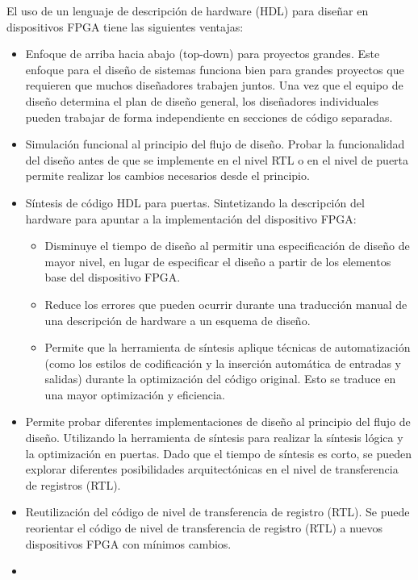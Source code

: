 El uso de un lenguaje de descripción de hardware (HDL) para diseñar en dispositivos FPGA tiene las siguientes
ventajas:
\begin{itemize}
\item
Enfoque de arriba hacia abajo (top-down) para proyectos grandes.
Este enfoque para el diseño de sistemas funciona bien para grandes proyectos que requieren que muchos diseñadores trabajen juntos. Una vez que el equipo de diseño determina el plan de diseño general, los diseñadores individuales pueden trabajar de forma independiente en secciones de código separadas.
\item
Simulación funcional al principio del flujo de diseño.
Probar la funcionalidad del diseño antes de que se implemente en el nivel RTL o en el nivel de puerta permite realizar los cambios necesarios desde el principio.

\item
Síntesis de código HDL para puertas. Sintetizando la descripción del hardware para apuntar a la implementación del dispositivo FPGA:

	\begin{itemize}
	\item
	Disminuye el tiempo de diseño al permitir una especificación de diseño de mayor nivel, en lugar de especificar el diseño a partir de los elementos base del dispositivo FPGA.
	\item
	Reduce los errores que pueden ocurrir durante una traducción manual de una descripción de hardware a un esquema de diseño.
	\item
	Permite que la herramienta de síntesis aplique técnicas de automatización (como los estilos de codificación y la inserción automática de entradas y salidas) durante la optimización del código original. Esto se traduce en una mayor optimización y eficiencia.
	\end{itemize}


\item
Permite probar diferentes implementaciones de diseño al principio del flujo de diseño. Utilizando la herramienta de síntesis para realizar la síntesis lógica y la optimización en puertas. Dado que el tiempo de síntesis es corto, se pueden explorar diferentes posibilidades arquitectónicas en el nivel de transferencia de registros (RTL).
\item
Reutilización del código de nivel de transferencia de registro (RTL).
Se puede reorientar el código de nivel de transferencia de registro (RTL) a nuevos dispositivos FPGA con mínimos cambios.
\item

\end{itemize}

